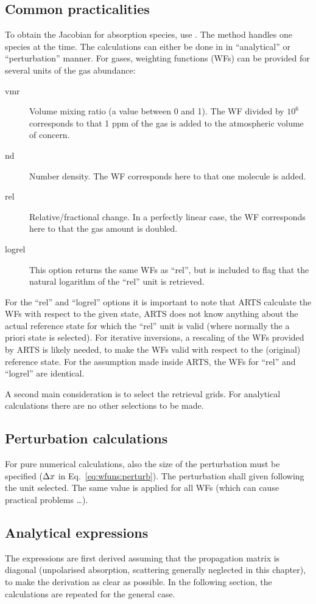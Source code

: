 \subsection{Common practicalities}
%
To obtain the Jacobian for absorption species, use
. The method handles one species at the time.
The calculations can either be done in in ``analytical'' or ``perturbation''
manner. For gases, weighting functions (WFs) can be provided for several units
of the gas abundance:
\begin{description}
\item[vmr] Volume mixing ratio (a value between 0 and 1). The WF divided by
  $10^6$ corresponds to that 1 ppm of the gas is added to the atmospheric
  volume of concern.
\item[nd] Number density. The WF corresponds here to that one molecule is added.
\item[rel] Relative/fractional change. In a perfectly linear case, the WF
  corresponds here to that the gas amount is doubled.
\item[logrel] This option returns the same WFs as ``rel'', but is included to
  flag that the natural logarithm of the ``rel'' unit is retrieved.
\end{description}
For the ``rel'' and ``logrel'' options it is important to note that ARTS
calculate the WFs with respect to the given state, ARTS does not know anything
about the actual reference state for which the ``rel'' unit is valid (where
normally the a priori state is selected). For iterative inversions, a rescaling
of the WFs provided by ARTS is likely needed, to make the WFs valid with
respect to the (original) reference state. For the assumption made inside ARTS,
the WFs for ``rel'' and ``logrel'' are identical.

A second main consideration is to select the retrieval grids. For analytical
calculations there are no other selections to be made. 


\subsection{Perturbation calculations}
%
For pure numerical calculations, also the size of the perturbation must be
specified ($\Delta x$ in Eq.~\ref{eq:wfuns:perturb}). The perturbation
shall given following the unit selected. The same value is applied for all WFs
(which can cause practical problems \dots).


\subsection{Analytical expressions}
%
The expressions are first derived assuming that the propagation matrix is
diagonal (unpolarised absorption, scattering generally neglected in this
chapter), to make the derivation as clear as possible. In the following
section, the calculations are repeated for the general case.

